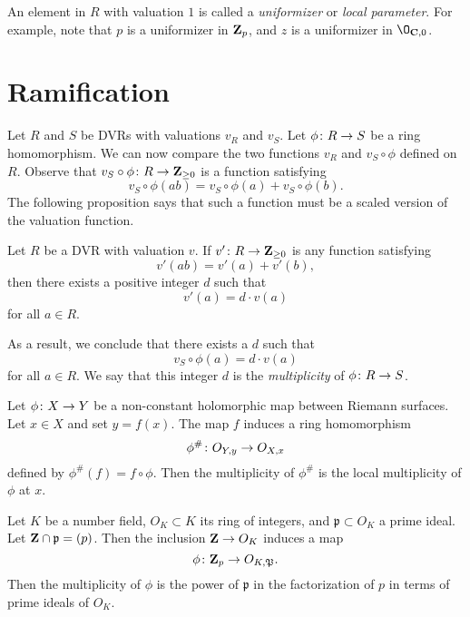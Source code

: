 \documentclass[12pt]{article}
\begin{document}
An element in $R$ with valuation $1$ is called a \emph{uniformizer} or \emph{local parameter}.
For example, note that $p$ is a uniformizer in ${\bf Z}_p$, and $z$ is a uniformizer in $\O_{\C, 0}$.

\section{Ramification}
Let $R$ and $S$ be DVRs with valuations $v_R$ and $v_S$.
Let $\phi {\colon} R \to S$ be a ring homomorphism.
We can now compare the two functions $v_R$ and $v_S \circ \phi$ defined on $R$.
Observe that $v_S \circ \phi {\colon} R \to {\bf Z}_{\geq 0}$ is a function satisfying
\[ v_S \circ \phi (ab) = v_S\circ \phi (a) + v_S\circ\phi(b).\]
The following proposition says that such a function must be a scaled version of the valuation function.
\begin{proposition}
  Let $R$ be a DVR with valuation $v$.
  If $v' {\colon} R \to {\bf Z}_{\geq 0}$ is any function satisfying
  \[ v'(ab) = v'(a) + v'(b),\]
  then there exists a positive integer $d$ such that
  \[ v'(a) = d \cdot v(a)\]
  for all $a \in R$.
\end{proposition}
As a result, we conclude that there exists a $d$ such that
\[ v_S\circ\phi(a) = d \cdot v(a)\]
for all $a \in R$.
We say that this integer $d$ is the \emph{multiplicity} of $\phi {\colon} R \to S$.

\begin{example}
  Let $\phi {\colon} X \to Y$ be a non-constant holomorphic map between Riemann surfaces.
  Let $x \in X$ and set $y = f(x)$.
  The map $f$ induces a ring homomorphism
  \[ \phi^{\#} {\colon} O_{Y,y} \to O_{X,x}\]
  defined by $\phi^\# (f) = f \circ \phi$.
  Then the multiplicity of $\phi^\#$ is the local multiplicity of $\phi$ at $x$.
\end{example}

\begin{example}
  Let $K$ be a number field, $O_K \subset K$ its ring of integers, and $\mathfrak p \subset O_K$ a prime ideal.
  Let ${\bf Z} \cap \mathfrak p = (p)$.
  Then the inclusion ${\bf Z} \to O_K$ induces a map
  \[ \phi {\colon} {\bf Z}_p \to O_{K, \mathfrak P}.\]
  Then the multiplicity of $\phi$ is the power of $\mathfrak p$ in the factorization of $p$ in terms of prime ideals of $O_K$.
\end{example}
\end{document}
